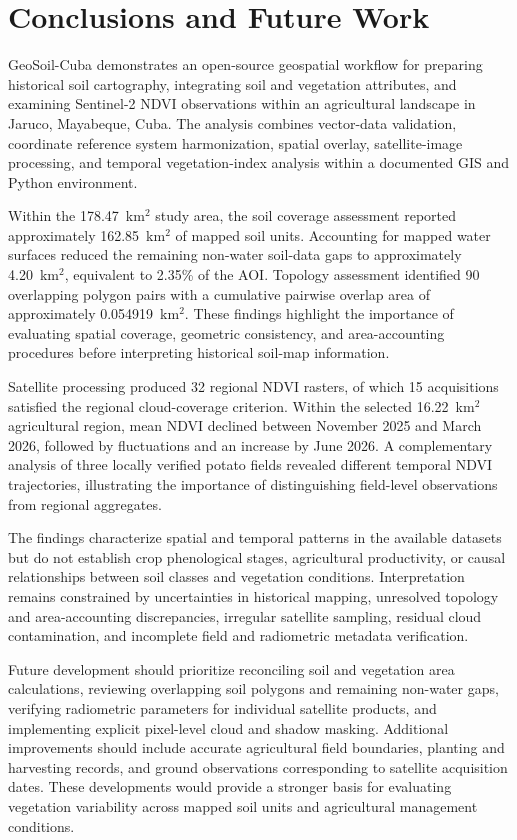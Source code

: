 \section{Conclusions and Future Work}
\label{sec:conclusions}

GeoSoil-Cuba demonstrates an open-source geospatial
workflow for preparing historical soil cartography,
integrating soil and vegetation attributes, and
examining Sentinel-2 NDVI observations within an
agricultural landscape in Jaruco, Mayabeque, Cuba.
The analysis combines vector-data validation,
coordinate reference system harmonization,
spatial overlay, satellite-image processing,
and temporal vegetation-index analysis within
a documented GIS and Python environment.

Within the 178.47~km$^2$ study area, the soil
coverage assessment reported approximately
162.85~km$^2$ of mapped soil units. Accounting
for mapped water surfaces reduced the remaining
non-water soil-data gaps to approximately
4.20~km$^2$, equivalent to 2.35\% of the AOI.
Topology assessment identified 90 overlapping
polygon pairs with a cumulative pairwise overlap
area of approximately 0.054919~km$^2$.
These findings highlight the importance of
evaluating spatial coverage, geometric consistency,
and area-accounting procedures before interpreting
historical soil-map information.

Satellite processing produced 32 regional NDVI
rasters, of which 15 acquisitions satisfied
the regional cloud-coverage criterion.
Within the selected 16.22~km$^2$ agricultural
region, mean NDVI declined between November 2025
and March 2026, followed by fluctuations and
an increase by June 2026. A complementary
analysis of three locally verified potato fields
revealed different temporal NDVI trajectories,
illustrating the importance of distinguishing
field-level observations from regional aggregates.

The findings characterize spatial and temporal
patterns in the available datasets but do not
establish crop phenological stages, agricultural
productivity, or causal relationships between
soil classes and vegetation conditions.
Interpretation remains constrained by uncertainties
in historical mapping, unresolved topology and
area-accounting discrepancies, irregular satellite
sampling, residual cloud contamination, and
incomplete field and radiometric metadata
verification.

Future development should prioritize reconciling
soil and vegetation area calculations, reviewing
overlapping soil polygons and remaining non-water
gaps, verifying radiometric parameters for
individual satellite products, and implementing
explicit pixel-level cloud and shadow masking.
Additional improvements should include accurate
agricultural field boundaries, planting and
harvesting records, and ground observations
corresponding to satellite acquisition dates.
These developments would provide a stronger
basis for evaluating vegetation variability
across mapped soil units and agricultural
management conditions.

